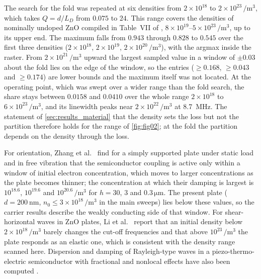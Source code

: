 The search for the fold was repeated at six densities from
$2\times10^{18}$ to $2\times10^{23}\,\si{\per\cubic\metre}$, which takes $Q=d/L_D$ from $0.075$ to $24$.  This range covers the densities of nominally undoped ZnO compiled in Table~VII of \cite{ozgur2005zno}, $8\times10^{19}$--$5\times10^{23}\,\si{\per\cubic\metre}$, up to its upper end.  The
maximum falls from $0.943$ through $0.828$ to $0.545$ over the first three densities ($2\times10^{18}$, $2\times10^{19}$, $2\times10^{20}\,\si{\per\cubic\metre}$), with the argmax inside the raster.  From
$2\times10^{21}\,\si{\per\cubic\metre}$ upward the largest sampled value in a window of $\pm0.03$ about the
fold lies on the edge of the window, so the entries ($\ge0.168$, $\ge0.043$ and $\ge0.174$) are lower bounds and the maximum itself was not located.  At the operating
point, which was swept over a wider range than the fold search, the share stays between $0.0158$ and $0.0410$ over the whole range $2\times10^{18}$ to
$6\times10^{23}\,\si{\per\cubic\metre}$, and its linewidth peaks near $2\times10^{22}\,\si{\per\cubic\metre}$ at
\SI{8.7}{\mega\hertz}.  The statement of \cref{sec:results_material} that the density sets the loss but not the
partition therefore holds for the range of \cref{fig:fig02}; at the fold the partition depends on the density through the loss.


For orientation, Zhang et al.\ \cite{zhang2025pscplate} find for a simply supported plate under static load and in free vibration that the semiconductor coupling is active only within a window of initial electron concentration, which moves to larger concentrations as the plate becomes thinner; the concentration at which their damping is largest is $10^{18.6}$, $10^{19.6}$ and $10^{20.6}\,\si{\per\cubic\metre}$ for $h=30$, $3$ and $0.3\,\si{\micro\metre}$.  The present plate ($d=\SI{200}{\nano\metre}$, $n_0\le3\times10^{18}\,\si{\per\cubic\metre}$ in the main sweeps) lies below these values, so the carrier results describe the weakly conducting side of that window.  For shear-horizontal waves in ZnO plates, Li et al.\ \cite{li2023sh} report that an initial density below $2\times10^{18}\,\si{\per\cubic\metre}$ barely changes the cut-off frequencies and that above $10^{23}\,\si{\per\cubic\metre}$ the plate responds as an elastic one, which is consistent with the density range scanned here.  Dispersion and damping of Rayleigh-type waves in a piezo-thermo-electric semiconductor with fractional and nonlocal effects have also been computed \cite{aldandani2026kg}.


